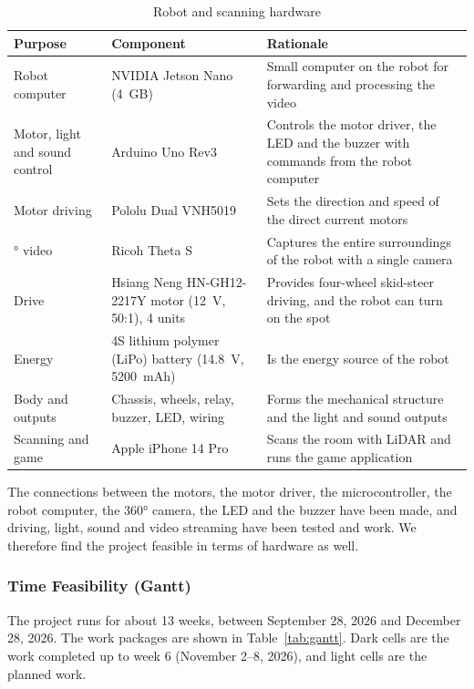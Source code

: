 \documentclass[11pt,a4paper]{article}
\begin{document}
\begin{table}[H]
\centering
\caption{Robot and scanning hardware}
\label{tab:donanim_maliyet}
\small
\begin{tabularx}{\linewidth}{>{\raggedright\arraybackslash}p{2.6cm} >{\raggedright\arraybackslash}p{4.3cm} >{\raggedright\arraybackslash}X}
\toprule
\textbf{Purpose} & \textbf{Component} & \textbf{Rationale} \\
\midrule
Robot computer & NVIDIA Jetson Nano (4~GB) & Small computer on the robot for forwarding and processing the video \\
Motor, light and sound control & Arduino Uno Rev3 & Controls the motor driver, the LED and the buzzer with commands from the robot computer \\
Motor driving & Pololu Dual VNH5019 & Sets the direction and speed of the direct current motors \\
360° video & Ricoh Theta S & Captures the entire surroundings of the robot with a single camera \\
Drive & Hsiang Neng HN-GH12-2217Y motor (12~V, 50:1), 4 units & Provides four-wheel skid-steer driving, and the robot can turn on the spot \\
Energy & 4S lithium polymer (LiPo) battery (14.8~V, 5200~mAh) & Is the energy source of the robot \\
Body and outputs & Chassis, wheels, relay, buzzer, LED, wiring & Forms the mechanical structure and the light and sound outputs \\
Scanning and game & Apple iPhone 14 Pro & Scans the room with LiDAR and runs the game application \\
\bottomrule
\end{tabularx}
\end{table}

The connections between the motors, the motor driver, the microcontroller, the robot computer, the 360° camera, the LED and the buzzer have been made, and driving, light, sound and video streaming have been tested and work. We therefore find the project feasible in terms of hardware as well.

\subsubsection{Time Feasibility (Gantt)}
\label{subsubsec:zaman_fizibilitesi}
The project runs for about 13 weeks, between September 28, 2026 and December 28, 2026. The work packages are shown in Table~\ref{tab:gantt}. Dark cells are the work completed up to week 6 (November 2--8, 2026), and light cells are the planned work.
\end{document}
